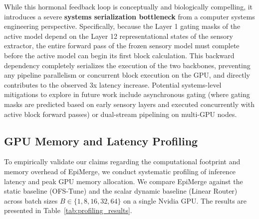 While this hormonal feedback loop is conceptually and biologically compelling, it introduces a severe \textbf{systems serialization bottleneck} from a computer systems engineering perspective. Specifically, because the Layer 1 gating masks of the active model depend on the Layer 12 representational states of the sensory extractor, the entire forward pass of the frozen sensory model must complete before the active model can begin its first block calculation. This backward dependency completely serializes the execution of the two backbones, preventing any pipeline parallelism or concurrent block execution on the GPU, and directly contributes to the observed 3x latency increase. Potential systems-level mitigations to explore in future work include asynchronous gating (where gating masks are predicted based on early sensory layers and executed concurrently with active block forward passes) or dual-stream pipelining on multi-GPU nodes.

\subsection{GPU Memory and Latency Profiling}
To empirically validate our claims regarding the computational footprint and memory overhead of EpiMerge, we conduct systematic profiling of inference latency and peak GPU memory allocation. We compare EpiMerge against the static baseline (OFS-Tune) and the scalar dynamic baseline (Linear Router) across batch sizes $B \in \{1, 8, 16, 32, 64\}$ on a single Nvidia GPU. The results are presented in Table~\ref{tab:profiling_results}.

